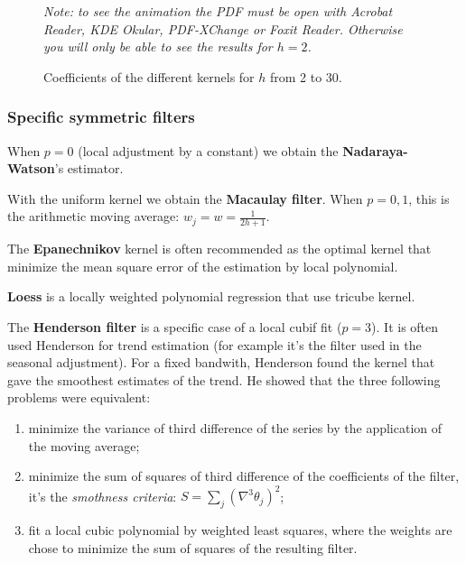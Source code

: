 \documentclass[
  12pt,
  ,
  a4paper]{article}
\providecommand{\tightlist}{%
  \setlength{\itemsep}{0pt}\setlength{\parskip}{0pt}}
\newcommand\1{\mathds{1}}
\begin{document}
\begin{figure}[H]
\caption{Coefficients of the different kernels for $h$ from 2 to 30.}\label{fig:kernels}\footnotesize
\emph{Note: to see the animation the PDF must be open with Acrobat Reader, KDE Okular, PDF-XChange or Foxit Reader. 
Otherwise you will only be able to see the results for $h=2$.}
\end{figure}

\hypertarget{sec:sympolyfilter}{%
\subsubsection{Specific symmetric filters}\label{sec:sympolyfilter}}

When \(p=0\) (local adjustment by a constant) we obtain the \textbf{Nadaraya-Watson}'s estimator.

With the uniform kernel we obtain the \textbf{Macaulay filter}. When \(p=0,1\), this is the arithmetic moving average: \(w_j=w=\frac{1}{2h+1}\).

The \textbf{Epanechnikov} kernel is often recommended as the optimal kernel that minimize the mean square error of the estimation by local polynomial.

\textbf{Loess} is a locally weighted polynomial regression that use tricube kernel.

The \textbf{Henderson filter} is a specific case of a local cubif fit (\(p=3\)).
It is often used Henderson for trend estimation (for example it's the filter used in the seasonal adjustment). For a fixed bandwith, Henderson found the kernel that gave the smoothest estimates of the trend.
He showed that the three following problems were equivalent:

\begin{enumerate}
\def\labelenumi{\arabic{enumi}.}
\tightlist
\item
  minimize the variance of third difference of the series by the application of the moving average;\\
\item
  minimize the sum of squares of third difference of the coefficients of the filter, it's the \emph{smothness criteria}: \(S=\sum_j(\nabla^{3}\theta_{j})^{2}\);\\
\item
  fit a local cubic polynomial by weighted least squares, where the weights are chose to minimize the sum of squares of the resulting filter.
\end{enumerate}
\end{document}
